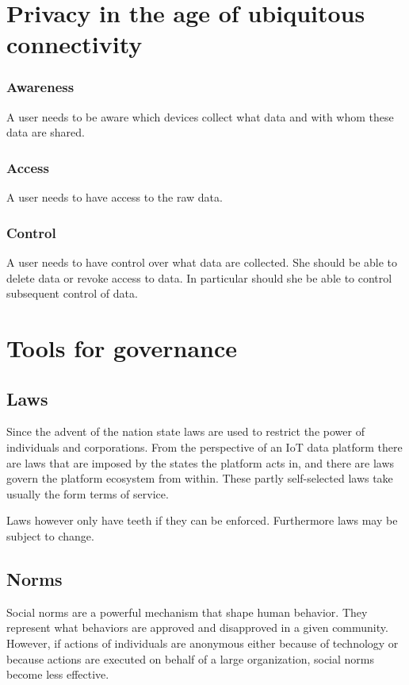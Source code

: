 \documentclass[journal]{IEEEtran}
\begin{document}
\section{Privacy in the age of ubiquitous connectivity}

\subsubsection{Awareness}
A user needs to be aware which devices collect what data and with whom these data are shared.

\subsubsection{Access}
A user needs to have access to the raw data.

\subsubsection{Control}
A user needs to have control over what data are collected. She should be able to delete data or revoke access to data. In particular should she be able to control subsequent control of data. 


\section{Tools for governance}

\subsection{Laws}
Since the advent of the nation state laws are used to restrict the power of individuals and corporations. From the perspective of an IoT data platform there are laws that are imposed by the states the platform acts in, and there are laws govern the platform ecosystem from within. These partly self-selected laws take usually the form terms of service. 

Laws however only have teeth if they can be enforced. Furthermore laws may be subject to change.

\subsection{Norms} 

Social norms are a powerful mechanism that shape human behavior. They represent what behaviors are approved and disapproved in a given community. However, if actions of individuals are anonymous either because of technology or because actions are executed on behalf of a large organization, social norms become less effective.
\end{document}
